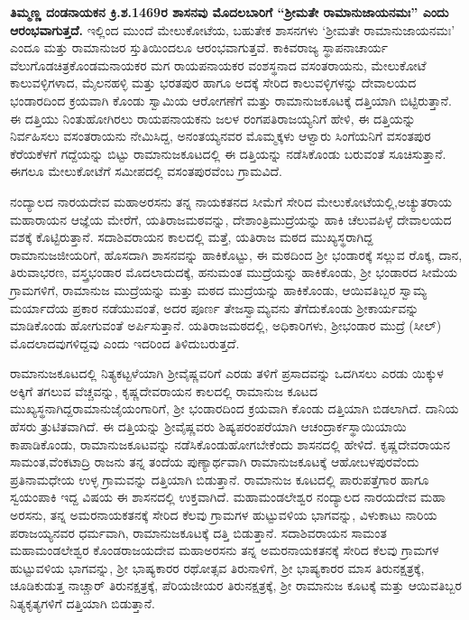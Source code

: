 \textbf{ತಿಮ್ಮಣ್ಣ ದಂಡನಾಯಕನ ಕ್ರಿ.ಶ.1469ರ ಶಾಸನವು ಮೊದಲಬಾರಿಗೆ “ಶ‍್ರೀಮತೇ ರಾಮಾನುಜಾಯನಮಃ” ಎಂದು ಆರಂಭವಾಗುತ್ತದೆ.} ಇಲ್ಲಿಂದ ಮುಂದೆ ಮೇಲುಕೋಟೆಯ, ಬಹುತೇಕ ಶಾಸನಗಳು ‘ಶ‍್ರೀಮತೇ ರಾಮಾನುಜಾಯನಮಃ’ ಎಂದೂ ಮತ್ತು ರಾಮಾನುಜರ ಸ್ತುತಿಯಿಂದಲೂ ಆರಂಭವಾಗುತ್ತವೆ. ಕಾಕಿವರಾಜ್ಯ ಸ್ಥಾಪನಾಚಾರ್ಯ ವೆಲುಗೊಡ\break ಚಿತ್ರಕೊಂಡಮನಾಯಕರ ಮಗ ರಾಯಪನಾಯಕರ ವಂಶಸ್ಥನಾದ ವಸಂತರಾಯನು, ಮೇಲುಕೋಟೆ ಕಾಲುವಳ್ಳಿಗಳಾದ, ಮೈಲನಹಳ್ಳಿ ಮತ್ತು ಭರತಪುರ ಹಾಗೂ ಅದಕ್ಕೆ ಸೇರಿದ ಕಾಲುವಳ್ಳಿಗಳನ್ನು ದೇವಾಲಯದ ಭಂಡಾರದಿಂದ ಕ್ರಯವಾಗಿ ಕೊಂಡು ಸ್ವಾಮಿಯ ಆರೋಗಣೆಗೆ ಮತ್ತು ರಾಮಾನುಜಕೂಟಕ್ಕೆ ದತ್ತಿಯಾಗಿ ಬಿಟ್ಟಿರುತ್ತಾನೆ. ಈ ದತ್ತಿಯು ನಿಂತುಹೋಗಿರಲು ರಾಯಪನಾಯಕನು ಜಲಳ ರಂಗಪತಿರಾಜಯ್ಯನಿಗೆ ಹೇಳಿ, ಈ ದತ್ತಿಯನ್ನು ನಿರ್ವಹಿಸಲು ವಸಂತರಾಯನು ನೇಮಿಸಿದ್ದ, ಅನಂತಯ್ಯನವರ ಮೊಮ್ಮಕ್ಕಳು ಆಳ್ವಾರು ಸಿಂಗೆಯನಿಗೆ ವಸಂತಪುರ ಕೆರೆಯಕೆಳಗೆ ಗದ್ದೆಯನ್ನು ಬಿಟ್ಟು ರಾಮಾನುಜಕೂಟದಲ್ಲಿ ಈ ದತ್ತಿಯನ್ನು ನಡೆಸಿಕೊಂಡು ಬರುವಂತೆ ಸೂಚಿಸುತ್ತಾನೆ. ಈಗಲೂ ಮೇಲುಕೋಟೆಗೆ ಸಮೀಪದಲ್ಲಿ ವಸಂತಪುರವೆಂಬ ಗ್ರಾಮವಿದೆ.

ನಂದ್ಯಾಲದ ನಾರಯದೇವ ಮಹಾಅರಸನು ತನ್ನ ನಾಯಕತನದ ಸೀಮೆಗೆ ಸೇರಿದ ಮೇಲುಕೋಟೆಯಲ್ಲಿ,\break ಅಚ್ಯುತರಾಯ ಮಹಾರಾಯನ ಆಜ್ಞೆಯ ಮೇರೆಗೆ, ಯತಿರಾಜಮಠವನ್ನು, ದೇಶಾಂತ್ರಿಮುದ್ರೆಯನ್ನು ಹಾಕಿ ಚೆಲುವಪಿಳ್ಳೆ ದೇವಾಲಯದ ವಶಕ್ಕೆ ಕೊಟ್ಟಿರುತ್ತಾನೆ. ಸದಾಶಿವರಾಯನ ಕಾಲದಲ್ಲಿ ಮತ್ತೆ, ಯತಿರಾಜ ಮಠದ ಮುಖ್ಯಸ್ಥರಾಗಿದ್ದ ರಾಮಾನುಜಜೀಯರಿಗೆ, ಹೊಸದಾಗಿ ಶಾಸನವನ್ನು ಹಾಕಿಕೊಟ್ಟು, ಈ ಮಠದಿಂದ ಶ‍್ರೀ ಭಂಡಾರಕ್ಕೆ ಸಲ್ಲುವ ರೊಕ್ಕ, ದಾನ, ತಿರುವಾಭರಣ, ವಸ್ತ್ರಭಂಡಾರ ಮೊದಲಾದುದಕ್ಕೆ, ಹನುಮಂತ ಮುದ್ರೆಯನ್ನು ಹಾಕಿಕೊಂಡು, ಶ‍್ರೀ ಭಂಡಾರದ ಸೀಮೆಯ ಗ್ರಾಮಗಳಿಗೆ, ರಾಮಾನುಜ ಮುದ್ರೆಯನ್ನು ಮತ್ತು ಮಠದ ಮುದ್ರೆಯನ್ನು ಹಾಕಿಕೊಂಡು, ಆಯಿವತಿಬ್ಬರ ಸ್ವಾಮ್ಯ ಮರ್ಯಾದೆಯ ಪ್ರಕಾರ ನಡೆಯುವಂತೆ, ಅದರ ಪೂರ್ಣ ತೇಜಸ್ವಾಮ್ಯವನು ತೆಗೆದುಕೊಂಡು ಶ‍್ರೀಕಾರ್ಯವನ್ನು ಮಾಡಿಕೊಂಡು ಹೋಗುವಂತೆ ಅರ್ಪಿಸುತ್ತಾನೆ. ಯತಿರಾಜಮಠದಲ್ಲಿ, ಅಧಿಕಾರಿಗಳು, ಶ‍್ರೀಭಂಡಾರ ಮುದ್ರೆ (ಸೀಲ್​) ಮೊದಲಾದವುಗಳಿದ್ದವು ಎಂದು ಇದರಿಂದ ತಿಳಿದುಬರುತ್ತದೆ.

ರಾಮಾನುಜಕೂಟದಲ್ಲಿ ನಿತ್ಯಕಟ್ಟಳೆಯಾಗಿ ಶ‍್ರೀವೈಷ್ಣವರಿಗೆ ಎರಡು ತಳಿಗೆ ಪ್ರಸಾದವನ್ನು ಒದಗಿಸಲು ಎರಡು ಯಿಕ್ಕುಳ ಅಕ್ಕಿಗೆ ತಗಲುವ ವೆಚ್ಚವನ್ನು, ಕೃಷ್ಣದೇವರಾಯನ ಕಾಲದಲ್ಲಿ ರಾಮಾನುಜ ಕೂಟದ ಮುಖ್ಯಸ್ಥನಾಗಿದ್ದ\break ರಾಮಾನುಜೈಯಂಗಾರಿಗೆ, ಶ‍್ರೀ ಭಂಡಾರದಿಂದ ಕ್ರಯವಾಗಿ ಕೊಂಡು ದತ್ತಿಯಾಗಿ ಬಿಡಲಾಗಿದೆ. ದಾನಿಯ ಹೆಸರು ತ್ರುಟಿತವಾಗಿದೆ. ಈ ದತ್ತಿಯನ್ನು ಶ‍್ರೀವೈಷ್ಣವರು ಶಿಷ್ಯಪರಂಪರೆಯಾಗಿ ಆಚಂದ್ರಾರ್ಕಸ್ಥಾಯಿಯಾಯಿ ಕಾಪಾಡಿಕೊಂಡು, ರಾಮಾನುಜಕೂಟವನ್ನು ನಡೆಸಿಕೊಂಡು\-ಹೋಗಬೇಕೆಂದು ಶಾಸನದಲ್ಲಿ ಹೇಳಿದೆ. ಕೃಷ್ಣದೇವರಾಯನ ಸಾಮಂತ,\break ವೆಂಕಟಾದ್ರಿ ರಾಜನು ತನ್ನ ತಂದೆಯ ಪುಣ್ಯಾರ್ಥವಾಗಿ ರಾಮಾನುಜಕೂಟಕ್ಕೆ ಆಹೋಬಳಪುರವೆಂದು ಪ್ರತಿನಾಮಧೇಯ ಉಳ್ಳ ಗ್ರಾಮವನ್ನು ದತ್ತಿಯಾಗಿ ಬಿಡುತ್ತಾನೆ. ರಾಮಾನುಜ ಕೂಟದಲ್ಲಿ ಪಾರುಪತ್ತೆಗಾರ ಹಾಗೂ ಸ್ವಯಂಪಾಕಿ ಇದ್ದ ವಿಷಯ ಈ ಶಾಸನದಲ್ಲಿ ಉಕ್ತವಾಗಿದೆ. ಮಹಾಮಂಡಲೇಶ್ವರ ನಂದ್ಯಾಲದ ನಾರಯದೇವ ಮಹಾ ಅರಸನು, ತನ್ನ ಅಮರನಾಯಕತನಕ್ಕೆ ಸೇರಿದ ಕೆಲವು ಗ್ರಾಮಗಳ ಹುಟ್ಟುವಳಿಯ ಭಾಗವನ್ನು, ವಿಳುಕಾಟು ನಾರಿಯ ಪರಾಜಯ್ಯನವರ ಧರ್ಮವಾಗಿ, ರಾಮಾನುಜಕೂಟಕ್ಕೆ ದತ್ತಿ ಬಿಡುತ್ತಾನೆ. ಸದಾಶಿವರಾಯನ ಸಾಮಂತ ಮಹಾಮಂಡಲೇಶ್ವರ ಕೊಂಡರಾಜಯ\-ದೇವ ಮಹಾಅರಸನು ತನ್ನ ಅಮರನಾಯಕತನಕ್ಕೆ ಸೇರಿದ ಕೆಲವು ಗ್ರಾಮಗಳ ಹುಟ್ಟುವಳಿಯ ಭಾಗವನ್ನು, ಶ‍್ರೀ ಭಾಷ್ಯಕಾರರ ರಥೋತ್ಸವ ತಿರುನಾಳಿಗೆ, ಶ‍್ರೀ ಭಾಷ್ಯಕಾರರ ಮಾಸ ತಿರುನಕ್ಷತ್ರಕ್ಕೆ, ಚೂಡಿಕುಡುತ್ತ ನಾಚ್ಚಾರ್​ ತಿರುನಕ್ಷತ್ರಕ್ಕೆ, ಪೆರಿಯಜೀಯರ ತಿರುನಕ್ಷತ್ರಕ್ಕೆ, ಶ‍್ರೀ ರಾಮಾನುಜ ಕೂಟಕ್ಕೆ ಮತ್ತು ಆಯಿವತಿಬ್ಬರ ನಿತ್ಯಕೃತ್ಯಗಳಿಗೆ ದತ್ತಿಯಾಗಿ ಬಿಡುತ್ತಾನೆ.

